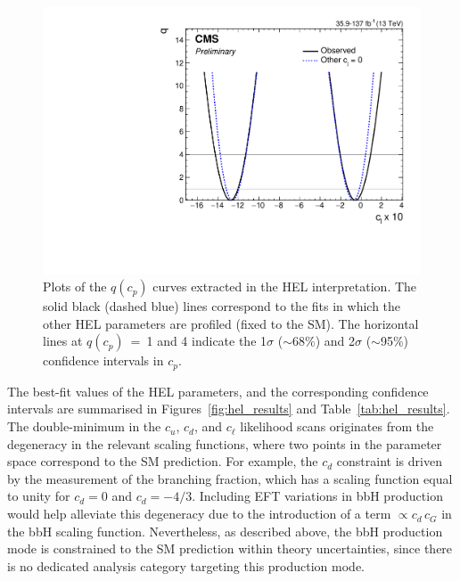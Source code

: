 \begin{figure}
  \includegraphics[width=.42\linewidth]{Figures/eft/cl_likelihood.pdf}
  \caption[Likelihood scans of the HEL parameters]
  {
    Plots of the $q(c_p)$ curves extracted in the HEL interpretation. The solid black (dashed blue) lines correspond to the fits in which the other HEL parameters are profiled (fixed to the SM). The horizontal lines at $q(c_p)$~=~1 and 4 indicate the 1$\sigma$ ($\sim$68\%) and 2$\sigma$ ($\sim$95\%) confidence intervals in $c_p$.
  }
  \label{fig:hel_likelihood_scans}
\end{figure}

The best-fit values of the HEL parameters, and the corresponding confidence intervals are summarised in Figures~\ref{fig:hel_results} and Table~\ref{tab:hel_results}. The double-minimum in the $c_u$, $c_d$, and $c_\ell$ likelihood scans originates from the degeneracy in the relevant scaling functions, where two points in the parameter space correspond to the SM prediction. For example, the $c_d$ constraint is driven by the measurement of the \Hbb branching fraction, which has a scaling function equal to unity for $c_d=0$ and $c_d=-4/3$. Including EFT variations in bbH production would help alleviate this degeneracy due to the introduction of a term $\propto c_d\,c_G$ in the bbH scaling function. Nevertheless, as described above, the bbH production mode is constrained to the SM prediction within theory uncertainties, since there is no dedicated analysis category targeting this production mode. 

